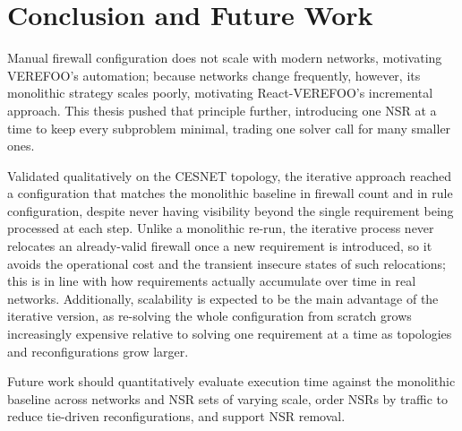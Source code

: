 \documentclass[a4paper, 10pt, twocolumn]{article}
\begin{document}
\section{Conclusion and Future Work}\label{sec:conclusions}

Manual firewall configuration does not scale with modern networks, motivating VEREFOO's automation; because networks change frequently, however, its monolithic strategy scales poorly, motivating React-VEREFOO's incremental approach. This thesis pushed that principle further, introducing one NSR at a time to keep every subproblem minimal, trading one solver call for many smaller ones.

Validated qualitatively on the CESNET topology, the iterative approach reached a configuration that matches the monolithic baseline in firewall count and in rule configuration, despite never having visibility beyond the single requirement being processed at each step. Unlike a monolithic re-run, the iterative process never relocates an already-valid firewall once a new requirement is introduced, so it avoids the operational cost and the transient insecure states of such relocations; this is in line with how requirements actually accumulate over time in real networks. Additionally, scalability is expected to be the main advantage of the iterative version, as re-solving the whole configuration from scratch grows increasingly expensive relative to solving one requirement at a time as topologies and reconfigurations grow larger.

Future work should quantitatively evaluate execution time against the monolithic baseline across networks and NSR sets of varying scale, order NSRs by traffic to reduce tie-driven reconfigurations, and support NSR removal.


% 
% 
\end{document}
